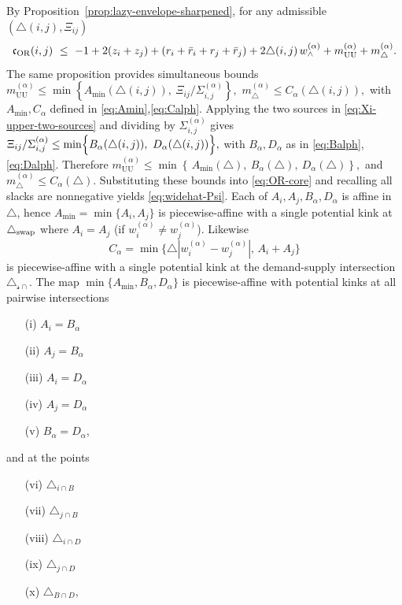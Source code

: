\documentclass[twoside,11pt]{article}
\numberwithin{equation}{section}
\numberwithin{theorem}{section}
\numberwithin{example}{section}
\begin{document}
\noindent
By Proposition~\ref{prop:lazy-envelope-sharpened}, for any admissible $(\triangle(i,j),\Xi_{ij})$
\begin{equation}
\label{eq:OR-core}
\mathfrak c_{\rm OR}(i,j)
\ \le\
-1+2(z_i+z_j)
+(r_i+\bar r_i+r_j+\bar r_j)
+2\triangle(i,j)\,w^{(\alpha)}_\wedge
+m^{(\alpha)}_{\mathrm{UU}}
+m^{(\alpha)}_{\triangle}.
\end{equation}
The same proposition provides simultaneous bounds
\(
m^{(\alpha)}_{\mathrm{UU}}
\le
\min\!\left\{A_{\min}(\triangle(i,j)),\ {\Xi_{ij}}/{\Sigma^{(\alpha)}_{i,j}}\right\},
\)
\(
m^{(\alpha)}_{\triangle}
\le
C_\alpha(\triangle(i,j)),
\)
with $A_{\min},C_\alpha$ defined in \eqref{eq:Amin},\eqref{eq:Calph}. Applying the two sources in
\eqref{eq:Xi-upper-two-sources} and dividing by $\Sigma^{(\alpha)}_{i,j}$ gives
\(
{\Xi_{ij}}/{\Sigma^{(\alpha)}_{i,j}}
\le
\min\Bigl\{B_\alpha(\triangle(i,j)),\ D_\alpha(\triangle(i,j))\Bigr\},
\)
with $B_\alpha,D_\alpha$ as in \eqref{eq:Balph}, \eqref{eq:Dalph}.
Therefore
\(
m^{(\alpha)}_{\mathrm{UU}}
\le
\min\!\left\{\,A_{\min}(\triangle),\ B_\alpha(\triangle),\ D_\alpha(\triangle)\right\},
\) and \(
m^{(\alpha)}_{\triangle} \le C_\alpha(\triangle).
\)
Substituting these bounds into \eqref{eq:OR-core} and recalling all slacks are nonnegative yields \eqref{eq:widehat-Psi}. Each of $A_i,A_j,B_\alpha,D_\alpha$ is affine in $\triangle$, hence $A_{\min}=\min\{A_i,A_j\}$ is piecewise-affine with a single potential kink at $\triangle_{\rm swap}$ where $A_i=A_j$ (if $w^{(\alpha)}_i\neq w^{(\alpha)}_j$). Likewise 
\[
C_\alpha=\min\{\triangle|w^{(\alpha)}_i-w^{(\alpha)}_j|,\,A_i+A_j\}
\]
is piecewise-affine with a single potential kink at the demand-supply intersection $\triangle_{\mathscr s\cap}$.
The map $\min\{A_{\min},B_\alpha,D_\alpha\}$ is piecewise-affine with potential kinks at all pairwise intersections
\begin{itemize}
\item[(i)] $A_i=B_\alpha$
\item[(ii)] $A_j=B_\alpha$
\item[(iii)] $A_i=D_\alpha$
\item[(iv)] $A_j=D_\alpha$
\item[(v)] $B_\alpha=D_\alpha$,
\end{itemize}
and at the points
\begin{itemize}
\item[(vi)] $\triangle_{i\cap B}$
\item[(vii)] $\triangle_{j\cap B}$
\item[(viii)] $\triangle_{i\cap D}$
\item[(ix)] $\triangle_{j\cap D}$
\item[(x)] $\triangle_{B\cap D}$,
\end{itemize}
\end{document}
